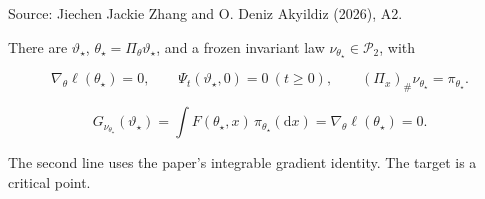 \documentclass[11pt,a4paper]{report}
\begin{document}
Source: Jiechen Jackie Zhang and O. Deniz Akyildiz (2026), A2.




There are \(\vartheta_\star\), \(\theta_\star=\Pi_\theta\vartheta_\star\), and a frozen invariant law \(\nu_{\theta_\star}\in\mathcal P_2\), with





\[\nabla_\theta\ell(\theta_\star)=0,\qquad \Psi_t(\vartheta_\star,0)=0\ (t\ge0),\qquad (\Pi_x)_\#\nu_{\theta_\star}=\pi_{\theta_\star}.\]







\[G_{\nu_{\theta_\star}}(\vartheta_\star)=\int F(\theta_\star,x)\,\pi_{\theta_\star}(\mathrm dx)=\nabla_\theta\ell(\theta_\star)=0.\]





The second line uses the paper’s integrable gradient identity. The target is a critical point.
\end{document}
